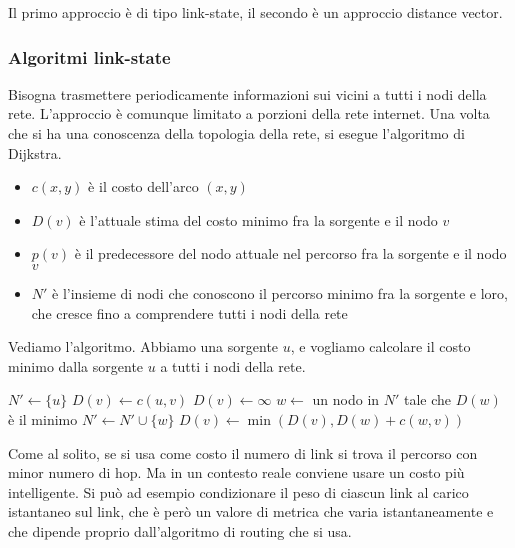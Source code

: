 Il primo approccio \`e di tipo link-state, il secondo \`e un approccio distance vector.

\subsubsection{Algoritmi link-state}

Bisogna trasmettere periodicamente informazioni sui vicini a tutti i nodi della rete. L'approccio \`e comunque limitato a porzioni della rete internet. Una volta che si ha una conoscenza della topologia della rete, si esegue l'algoritmo di Dijkstra.

\begin{itemize}
    \item $c(x,y)$ \`e il costo dell'arco $(x,y)$
    \item $D(v)$ \`e l'attuale stima del costo minimo fra la sorgente e il nodo $v$
    \item $p(v)$ \`e il predecessore del nodo attuale nel percorso fra la sorgente e il nodo $v$
    \item $N'$ \`e l'insieme di nodi che conoscono il percorso minimo fra la sorgente e loro, che cresce fino a comprendere tutti i nodi della rete
\end{itemize}

Vediamo l'algoritmo. Abbiamo una sorgente $u$, e vogliamo calcolare il costo minimo dalla sorgente $u$ a tutti i nodi della rete.

\begin{algorithm}[h]
\begin{algorithmic}
\State $N' \gets \{ u \}$
        \State $D(v) \gets c(u,v)$
    \Else
        \State $D(v) \gets \infty$
    \EndIf
\EndFor
\Repeat
    \State $w \gets$ un nodo in $N'$ tale che $D(w)$ \`e il minimo
    \State $N' \gets N' \cup \{ w \}$
        \State $D(v) \gets \min( D(v), D(w) + c(w,v))$
    \EndFor
{}
\end{algorithmic}
\end{algorithm}

Come al solito, se si usa come costo il numero di link si trova il percorso con minor numero di hop. Ma in un contesto reale conviene usare un costo pi\`u intelligente. Si pu\`o ad esempio condizionare il peso di ciascun link al carico istantaneo sul link, che \`e per\`o un valore di metrica che varia istantaneamente e che dipende proprio dall'algoritmo di routing che si usa.

